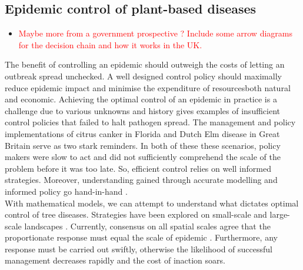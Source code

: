 \subsection{Epidemic control of plant-based diseases}
\begin{itemize}
    \item \textcolor{red}{Maybe more from a government prospective ? Include some arrow diagrams for the decision chain and how it works in the UK.}
\end{itemize}
The benefit of controlling an epidemic should outweigh the costs of letting an outbreak spread unchecked. A well designed control policy should maximally reduce epidemic impact and minimise the expenditure of resources\textemdash both natural and economic. Achieving the optimal control of an epidemic in practice is a challenge due to various unknowns \cite{13-challenges} and history gives examples of insufficient control policies that failed to halt pathogen spread. The management and policy implementations of citrus canker in Florida \cite{schubert2001meeting} and Dutch Elm disease in Great Britain \cite{dutch-elm-mismanage} serve as two stark reminders. In both of these these scenarios, policy makers were slow to act and did not sufficiently comprehend the scale of the problem before it was too late. So, efficient control relies on well informed strategies. Moreover, understanding gained through accurate modelling and informed policy go hand-in-hand \cite{jones2020modelling}.\\

With mathematical models, we can attempt to understand what dictates optimal control of tree diseases. Strategies have been explored on small-scale \cite{risk-potential-control, WEBIDEMICS} and large-scale landscapes \cite{large-scale-control, large-scale-control2}. Currently, consensus on all spatial scales agree that the proportionate response must equal the scale of epidemic \cite{control-scale-matching}. Furthermore, any response must be carried out swiftly, otherwise the likelihood of successful management decreases rapidly and the cost of inaction soars.\\


